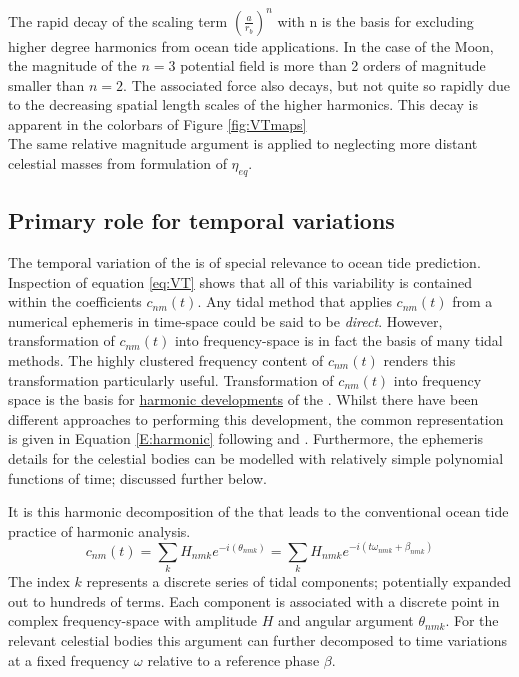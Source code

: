 The rapid decay of the scaling term $\left(\frac{a}{r_b} \right)^n$ with n is the basis for excluding higher degree harmonics from ocean tide applications.  In the case of the Moon, the magnitude of the $n=3$ potential field is more than 2 orders of magnitude smaller than $n=2$.  The associated force also decays, but not quite so rapidly due to the decreasing spatial length scales of the higher harmonics.  This decay is apparent in the colorbars of Figure \ref{fig:VTmaps}\\
The same relative magnitude argument is applied to neglecting more distant celestial masses from formulation of $\eta_{eq}$.

\subsection{Primary role for temporal variations}
\label{sec:temporal}
The temporal variation of the \ATGP{} is of special relevance to ocean tide prediction.  Inspection of equation \ref{eq:VT} shows that all of this variability is contained within the coefficients $c_{nm}(t)$.  
Any tidal method that applies $c_{nm}(t)$ from a numerical ephemeris in time-space could be said to be \emph{direct}. 
However, transformation of $c_{nm}(t)$ into frequency-space is in fact the basis of many tidal methods.   The highly clustered frequency content of $c_{nm}(t)$ renders this transformation particularly useful.  
Transformation of $c_{nm}(t)$ into frequency space is the basis for \underline{harmonic developments} of the \ATGP{}. Whilst there have been different approaches to performing this development, the common representation is given in Equation \ref{E:harmonic} following \citep{Desai:2006wo} and \citep[Eq 13]{Cartwright:1971iz}.
Furthermore, the ephemeris details for the celestial bodies can be modelled with relatively simple polynomial functions of time; discussed further below. 


It is this harmonic decomposition of the \ATGP{} that leads to the conventional ocean tide practice of harmonic analysis.
\begin{equation}
    c_{nm}(t) = \sum_{k} H_{nmk} e^{-i(\theta_{nmk})} = \sum_{k} H_{nmk} e^{-i( t\omega_{nmk} + \beta_{nmk})}
    \label{E:harmonic}
\end{equation}
The index $k$ represents a discrete series of tidal components; potentially expanded out to hundreds of terms.  Each component is associated with a discrete point in complex frequency-space with amplitude $H$ and angular argument $\theta_{nmk}$.   For the relevant celestial bodies this argument can further decomposed to time variations at a fixed frequency $\omega$ relative to a reference phase $\beta$.  

